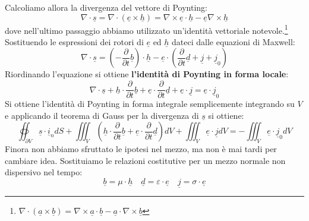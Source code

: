 \documentclass{book}
\begin{document}
        Calcoliamo allora la divergenza del vettore di Poynting:
        \begin{equation}
            \nabla \cdot \underline{s}  = \nabla \cdot (\underline{e} \times \underline{h}) = \nabla \times \underline{e} \cdot \underline{h}-\underline{e} \nabla \times \underline{h}
        \end{equation}
        dove nell'ultimo passaggio abbiamo utilizzato un'identità vettoriale notevole.\footnote{$\nabla \cdot (\underline{a} \times \underline{b}) = \nabla \times \underline{a} \cdot \underline{b} - \underline{a} \cdot \nabla \times \underline{b}$}
        Sostituendo le espressioni dei rotori di $\underline{e}$ ed $\underline{h}$ dateci dalle equazioni di Maxwell:
        \begin{equation}
            \nabla \cdot \underline{s} = (-\frac{\partial}{\partial t} \underline{b})\cdot \underline{h}-\underline{e} \cdot (\frac{\partial}{\partial t}\underline{d}+\underline{j}+\underline{j}_{0})
        \end{equation}
        Riordinando l'equazione si ottiene \textbf{l'identità di Poynting in forma locale}:
        \begin{equation}
            \nabla \cdot \underline{s} +\underline{h} \cdot \frac{\partial}{\partial t} \underline{b}+\underline{e} \cdot \frac{\partial}{\partial t}\underline{d}+\underline{e} \cdot \underline{j}= \underline{e} \cdot \underline{j}_{0}
        \end{equation}
        Si ottiene l'identità di Poynting in forma integrale semplicemente integrando su $V$ e applicando il teorema di Gauss per la divergenza di $\underline{s}$ si ottiene:
        \begin{equation}
            \oiint_{\partial V} \underline{s} \cdot \underline{i}_{n} dS + \iiint_{V} ( \underline{h} \cdot \frac{\partial}{\partial t} \underline{b}+\underline{e}\cdot \frac{\partial}{\partial t} \underline{d})dV + \iiint_{V} \underline{e} \cdot \underline{j}dV = - \iiint_{V} \underline{e} \cdot \underline{j}_{0} dV
        \end{equation}
        Finora non abbiamo sfruttato le ipotesi nel mezzo, ma non è mai tardi per cambiare idea.
        Sostituiamo le relazioni costitutive per un mezzo normale non dispersivo nel tempo:
        \begin{equation}
            \underline{b} = \mu \cdot \underline{h} \quad \underline{d} = \varepsilon \cdot \underline{e} \quad \underline{j} = \sigma \cdot \underline{e}
        \end{equation}
\end{document}
